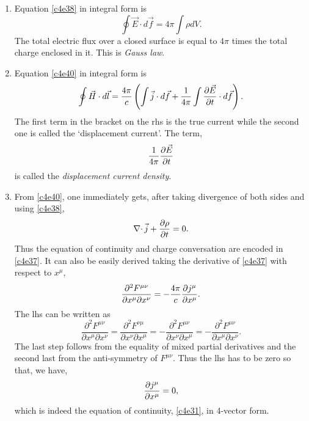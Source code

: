 \begin{enumerate}
\item Equation \eqref{c4e38} in integral form is
\begin{equation}\label{c4e41}
\oint\vec{E}\cdot d\vec{f} = 4\pi\int\rho dV.
\end{equation}
The total electric flux over a closed surface is equal to $4\pi$ times the total
charge enclosed in it. This is \emph{Gauss law}.

\item Equation \eqref{c4e40} in integral form is
\begin{equation}\label{c4e42}
\oint\vec{H}\cdot d\vec{l} = \frac{4\pi}{c}\left(\int\vec{j}\cdot d\vec{f} + 
\frac{1}{4\pi}\int\frac{\partial{\vec{E}}}{\partial{t}}\cdot d\vec{f}\right).
\end{equation}
The first term in the bracket on the rhs is the true current while the second 
one is called the `displacement current'. The term,
\[
\frac{1}{4\pi}\frac{\partial{\vec{E}}}{\partial{t}}
\]
is called the \emph{displacement current density}.

\item From \eqref{c4e40}, one immediately gets, after taking divergence of both 
sides and using \eqref{c4e38},
\[
\operatorname{\nabla\cdot}\vec{j} + \frac{\partial{\rho}}{\partial{t}} = 0.
\]
Thus the equation of continuity and charge conversation are encoded in 
\eqref{c4e37}. It can also be easily derived taking the derivative of 
\eqref{c4e37} with respect to $x^\mu$,
\[
\frac{\partial^2 F^{\mu\nu}}{\partial x^\mu \partial x^\nu} = 
-\frac{4\pi}{c}\frac{\partial{j^\mu}}{\partial{x^\mu}}.
\]
The lhs can be written as
\[
\frac{\partial^2 F^{\mu\nu}}{\partial x^\mu \partial x^\nu} = 
\frac{\partial^2 F^{\nu\mu}}{\partial x^\nu \partial x^\mu}
= -\frac{\partial^2 F^{\mu\nu}}{\partial x^\nu \partial x^\mu} = 
-\frac{\partial^2 F^{\mu\nu}}{\partial x^\mu \partial x^\nu}.
\]
The last step follows from the equality of mixed partial derivatives and the 
second last from the anti-symmetry of $F^{\mu\nu}$. Thus the lhs has to be zero
so that, we have,
\[
\frac{\partial{j^\mu}}{\partial{x^\mu}} = 0,
\]
which is indeed the equation of continuity, \eqref{c4e31}, in 4-vector form.


\end{enumerate}
